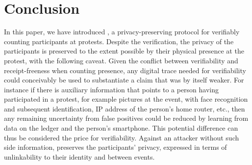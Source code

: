 \section{Conclusion}%
\label{Conclusion}

In this paper, we have introduced \CROCUS, a privacy-preserving protocol for verifiably counting participants at protests. 
Despite the verification, the privacy of the participants is preserved to the extent possible by their physical presence at the protest, with the following caveat. Given the conflict between verifiability and receipt-freeness when counting presence, any digital trace needed for verifiability could conceivably be used to substantiate a claim that was by itself weaker. For instance if there is auxiliary information that points to a person having participated in a protest, for example pictures at the event, with face recognition and subsequent identification, IP address of the person's home router, etc., then any remaining uncertainty from false positives could be reduced by learning from data on the ledger and the person's smartphone. This potential difference can thus be considered the price for verifiability. Against an attacker without such side information, \CROCUS preserves the participants' privacy, expressed in terms of unlinkability to their identity and between events. 



